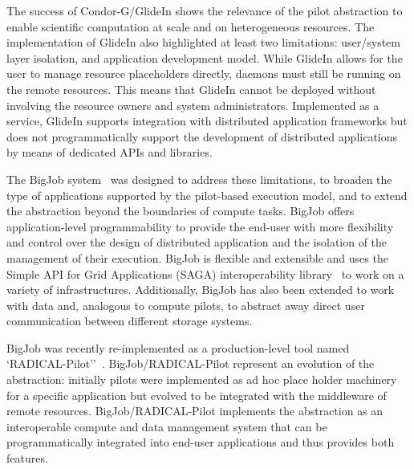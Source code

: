 \documentclass{sig-alternate}
\begin{document}

The success of Condor-G/GlideIn shows the relevance of the pilot abstraction to
enable scientific computation at scale and on heterogeneous resources. The
implementation of GlideIn also highlighted at least two limitations: user/system
layer isolation, and application development model. While GlideIn allows for the
user to manage resource placeholders directly, daemons must still be running on
the remote resources. This means that GlideIn cannot be deployed without
involving the resource owners and system administrators. Implemented as a
service, GlideIn supports integration with distributed application frameworks
but does not programmatically support the development of distributed
applications by means of dedicated APIs and libraries.

The BigJob \pilotjob system~\cite{luckow2010} was designed to address these
limitations, to broaden the type of applications supported by the pilot-based
execution model, and to extend the \pilot abstraction beyond the boundaries of
compute tasks.  BigJob offers application-level programmability to provide the
end-user with more flexibility and control over the design of distributed
application and the isolation of the management of their execution. BigJob is
flexible and extensible and uses the Simple API for Grid Applications (SAGA)
interoperability library~\cite{saga-x,goodale2006,luckow2010} to work on a
variety of infrastructures.  Additionally, BigJob has also been extended to work
with data and, analogous to compute pilots, to abstract away direct user
communication between different storage systems.



BigJob was recently re-implemented as a production-level tool named
`RADICAL-Pilot''~\cite{review_rp-paper-2015}. BigJob/RADICAL-Pilot represent an
evolution of the \pilot abstraction: initially pilots were implemented as ad hoc
place holder machinery for a specific application but evolved to be integrated
with the middleware of remote resources. BigJob/RADICAL-Pilot implements the
\pilot abstraction as an interoperable compute and data management system that
can be programmatically integrated into end-user applications and thus provides
both features.
\end{document}
